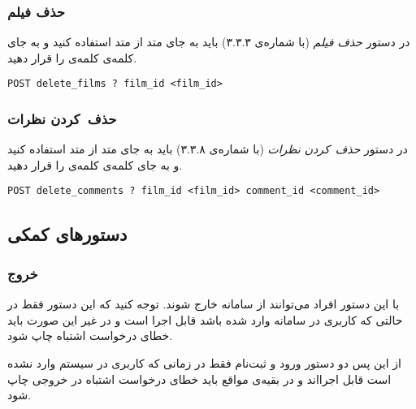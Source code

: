\documentclass{utap}
\begin{document}
    \subsubsection{حذف فیلم}

    در دستور \textit{حذف فیلم} (با شماره‌ی ۳.۳.۳) باید به جای متد  از متد  استفاده کنید و به جای کلمه‌ی  کلمه‌ی  را قرار دهید.
    \begin{latin}
        \scriptsize
        \begin{Verbatim}[frame=lines,label={\rl{دستور ورودی}}]
POST delete_films ? film_id <film_id>
        \end{Verbatim}
    \end{latin}

    \subsubsection{حذف~کردن نظرات}

    در دستور \textit{حذف~کردن نظرات} (با شماره‌ی ۳.۳.۸) باید به جای متد  از متد  استفاده کنید و به جای کلمه‌ی  کلمه‌ی  را قرار دهید.
    \begin{latin}
        \scriptsize
        \begin{Verbatim}[frame=lines,label={\rl{دستور ورودی}}]
POST delete_comments ? film_id <film_id> comment_id <comment_id>
        \end{Verbatim}
    \end{latin}

    \subsection{دستورهای کمکی}

    \subsubsection{خروج}

    با این دستور افراد می‌توانند از سامانه خارج شوند. توجه کنید که این دستور فقط در حالتی که کاربری در سامانه وارد شده باشد قابل اجرا است و در غیر این صورت باید خطای درخواست اشتباه چاپ شود.

    از این پس دو دستور ورود و ثبت‌نام فقط در زمانی که کاربری در سیستم وارد نشده است قابل اجرااند و در بقیه‌ی مواقع باید خطای درخواست اشتباه در خروجی چاپ شود.
\end{document}
